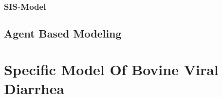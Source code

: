 \subsubsection{SIS-Model}
\subsection{Agent Based Modeling}
\section{Specific Model Of Bovine Viral Diarrhea}